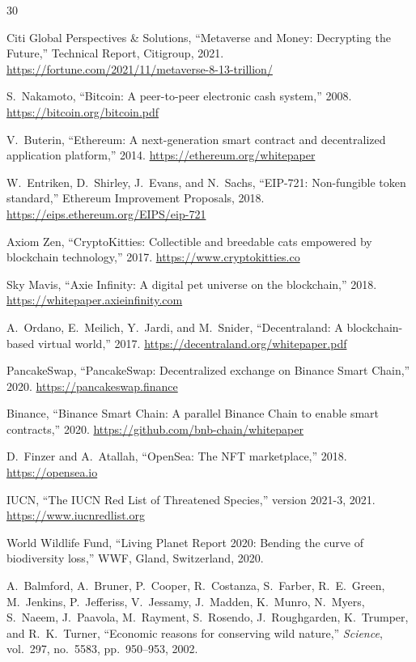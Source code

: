 \documentclass[11pt,letterpaper]{article}
\begin{document}
\begin{thebibliography}{30}

Citi Global Perspectives \& Solutions, ``Metaverse and Money: Decrypting the Future,''
Technical Report, Citigroup, 2021.
\url{https://fortune.com/2021/11/metaverse-8-13-trillion/}

S.~Nakamoto, ``Bitcoin: A peer-to-peer electronic cash system,'' 2008.
\url{https://bitcoin.org/bitcoin.pdf}

V.~Buterin, ``Ethereum: A next-generation smart contract and decentralized application
platform,'' 2014. \url{https://ethereum.org/whitepaper}

W.~Entriken, D.~Shirley, J.~Evans, and N.~Sachs, ``EIP-721: Non-fungible token standard,''
Ethereum Improvement Proposals, 2018. \url{https://eips.ethereum.org/EIPS/eip-721}

Axiom Zen, ``CryptoKitties: Collectible and breedable cats empowered by blockchain
technology,'' 2017. \url{https://www.cryptokitties.co}

Sky Mavis, ``Axie Infinity: A digital pet universe on the blockchain,'' 2018.
\url{https://whitepaper.axieinfinity.com}

A.~Ordano, E.~Meilich, Y.~Jardi, and M.~Snider, ``Decentraland: A blockchain-based
virtual world,'' 2017. \url{https://decentraland.org/whitepaper.pdf}

PancakeSwap, ``PancakeSwap: Decentralized exchange on Binance Smart Chain,'' 2020.
\url{https://pancakeswap.finance}

Binance, ``Binance Smart Chain: A parallel Binance Chain to enable smart contracts,''
2020. \url{https://github.com/bnb-chain/whitepaper}

D.~Finzer and A.~Atallah, ``OpenSea: The NFT marketplace,'' 2018.
\url{https://opensea.io}

IUCN, ``The IUCN Red List of Threatened Species,'' version 2021-3, 2021.
\url{https://www.iucnredlist.org}

World Wildlife Fund, ``Living Planet Report 2020: Bending the curve of biodiversity
loss,'' WWF, Gland, Switzerland, 2020.

A.~Balmford, A.~Bruner, P.~Cooper, R.~Costanza, S.~Farber, R.~E.~Green, M.~Jenkins,
P.~Jefferiss, V.~Jessamy, J.~Madden, K.~Munro, N.~Myers, S.~Naeem, J.~Paavola,
M.~Rayment, S.~Rosendo, J.~Roughgarden, K.~Trumper, and R.~K.~Turner,
``Economic reasons for conserving wild nature,'' \textit{Science}, vol.~297, no.~5583,
pp.~950--953, 2002.


\end{thebibliography}
\end{document}
